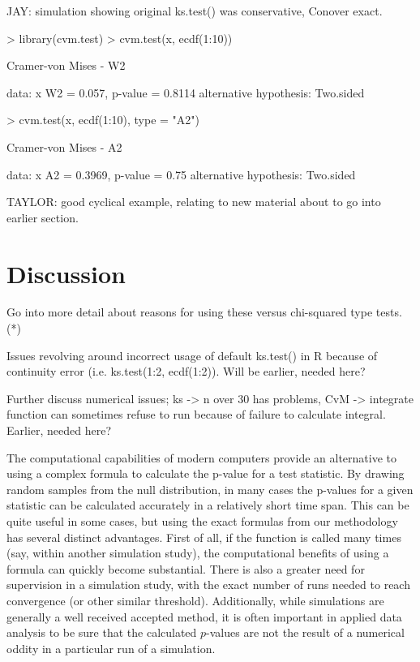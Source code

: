 JAY: simulation showing original ks.test() was conservative, Conover exact.

\begin{Schunk}
\begin{Sinput}
> library(cvm.test)
> cvm.test(x, ecdf(1:10))
\end{Sinput}
\begin{Soutput}
	Cramer-von Mises - W2

data:  x 
W2 = 0.057, p-value = 0.8114
alternative hypothesis: Two.sided 
\end{Soutput}
\begin{Sinput}
> cvm.test(x, ecdf(1:10), type = "A2")
\end{Sinput}
\begin{Soutput}
	Cramer-von Mises - A2

data:  x 
A2 = 0.3969, p-value = 0.75
alternative hypothesis: Two.sided 
\end{Soutput}
\end{Schunk}

TAYLOR: good cyclical example, relating to new material about to go into
earlier section.


\section{Discussion}

Go into more detail about reasons for using these versus chi-squared type tests. (*) 

Issues revolving around incorrect usage of default ks.test() in R because of continuity error (i.e. ks.test(1:2, ecdf(1:2)).  Will be earlier, needed here?

Further discuss numerical issues; ks -> n over 30 has problems, CvM -> integrate function can sometimes refuse to run because of failure to calculate integral.
Earlier, needed here?

The computational capabilities of modern computers provide an alternative to using a complex formula to
calculate the p-value for a test statistic. By drawing random samples from the null distribution, in many
cases the p-values for a given statistic can be calculated accurately in a relatively short time span.
This can be quite useful in some cases, but using the exact formulas from our methodology has several
distinct advantages. First of all, if the function is called many times (say, within another simulation
study), the computational benefits of using a formula can quickly become substantial. There is also a greater need
for supervision in a simulation study, with the exact number of runs needed to reach convergence (or other 
similar threshold). Additionally, while
simulations are generally a well received accepted method, it is often important in applied data analysis
to be sure that the calculated $p$-values are not the result of a numerical oddity in a particular
run of a simulation. 

